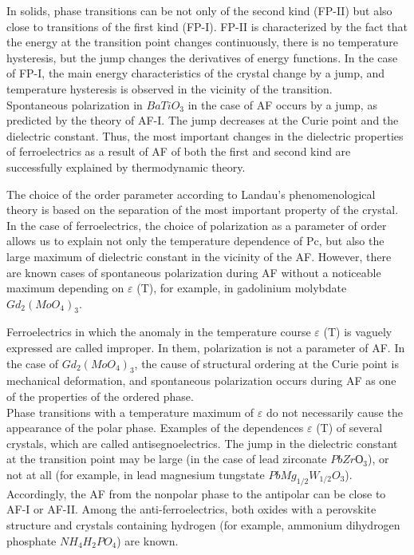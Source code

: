 \documentclass[a4paper,14pt]{extreport}
\begin{document}
In solids, phase transitions can be not only of the second kind (FP-II) but also close to transitions of the first kind (FP-I). FP-II is characterized by the fact that the energy at the transition point changes continuously, there is no temperature hysteresis, but the jump changes the derivatives of energy functions. In the case of FP-I, the main energy characteristics of the crystal change by a jump, and temperature hysteresis is observed in the vicinity of the transition. \\
Spontaneous polarization in $ BaTiO_3 $ in the case of AF occurs by a jump, as predicted by the theory of AF-I. The jump decreases at the Curie point and the dielectric constant. Thus, the most important changes in the dielectric properties of ferroelectrics as a result of AF of both the first and second kind are successfully explained by thermodynamic theory. \par
The choice of the order parameter according to Landau's phenomenological theory is based on the separation of the most important property of the crystal. In the case of ferroelectrics, the choice of polarization as a parameter of order allows us to explain not only the temperature dependence of Pc, but also the large maximum of dielectric constant in the vicinity of the AF. However, there are known cases of spontaneous polarization during AF without a noticeable maximum depending on $\varepsilon $ (T), for example, in gadolinium molybdate $ Gd_2 (MoO_4) _3 $. \par
Ferroelectrics in which the anomaly in the temperature course $\varepsilon $ (T) is vaguely expressed are called improper. In them, polarization is not a parameter of AF. In the case of $ Gd_2 (MoO_4) _3 $, the cause of structural ordering at the Curie point is mechanical deformation, and spontaneous polarization occurs during AF as one of the properties of the ordered phase. \\
Phase transitions with a temperature maximum of $\varepsilon $ do not necessarily cause the appearance of the polar phase. Examples of the dependences $\varepsilon $ (T) of several crystals, which are called antisegnoelectrics. The jump in the dielectric constant at the transition point may be large (in the case of lead zirconate $ PbZrО_3 $), or not at all (for example, in lead magnesium tungstate $ PbMg_ {1/2} W_ {1/2} O_3 $). Accordingly, the AF from the nonpolar phase to the antipolar can be close to AF-I or AF-II. Among the anti-ferroelectrics, both oxides with a perovskite structure and crystals containing hydrogen (for example, ammonium dihydrogen phosphate $ NH_4H_2PO_4 $) are known.
\end{document}
